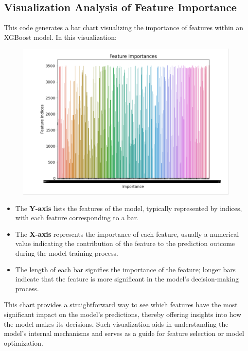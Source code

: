 \documentclass[12pt]{article}
\begin{document}
\subsection*{Visualization Analysis of Feature Importance}
This code generates a bar chart visualizing the importance of features within an XGBoost model. In this visualization:
\begin{figure}[htbp]
  \centering
  \begin{minipage}[b]{0.75\textwidth}
    \includegraphics[width=\textwidth]{5.png}
  \end{minipage}
  \end{figure}
\begin{itemize}
    \item The \textbf{Y-axis} lists the features of the model, typically represented by indices, with each feature corresponding to a bar.
    \item The \textbf{X-axis} represents the importance of each feature, usually a numerical value indicating the contribution of the feature to the prediction outcome during the model training process.
    \item The length of each bar signifies the importance of the feature; longer bars indicate that the feature is more significant in the model's decision-making process.
\end{itemize}

This chart provides a straightforward way to see which features have the most significant impact on the model's predictions, thereby offering insights into how the model makes its decisions. Such visualization aids in understanding the model's internal mechanisms and serves as a guide for feature selection or model optimization.
\end{document}
